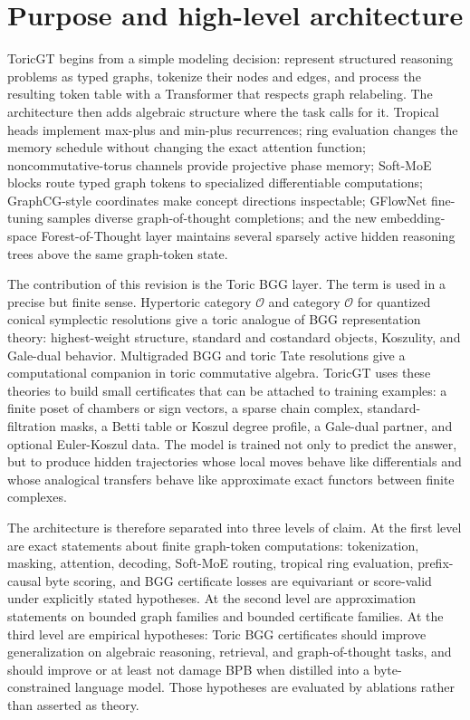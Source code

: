 \documentclass[11pt]{article}
\theoremstyle{definition}
\theoremstyle{plain}
\theoremstyle{remark}
\numberwithin{equation}{section}
\begin{document}
\tableofcontents
\newpage


\section{Purpose and high-level architecture}

ToricGT begins from a simple modeling decision: represent structured reasoning problems as typed graphs, tokenize their nodes and edges, and process the resulting token table with a Transformer that respects graph relabeling.  The architecture then adds algebraic structure where the task calls for it.  Tropical heads implement max-plus and min-plus recurrences; ring evaluation changes the memory schedule without changing the exact attention function; noncommutative-torus channels provide projective phase memory; Soft-MoE blocks route typed graph tokens to specialized differentiable computations; GraphCG-style coordinates make concept directions inspectable; GFlowNet fine-tuning samples diverse graph-of-thought completions; and the new embedding-space Forest-of-Thought layer maintains several sparsely active hidden reasoning trees above the same graph-token state.

The contribution of this revision is the Toric BGG layer.  The term is used in a precise but finite sense.  Hypertoric category $\mathcal O$ and category $\mathcal O$ for quantized conical symplectic resolutions give a toric analogue of BGG representation theory: highest-weight structure, standard and costandard objects, Koszulity, and Gale-dual behavior.  Multigraded BGG and toric Tate resolutions give a computational companion in toric commutative algebra.  ToricGT uses these theories to build small certificates that can be attached to training examples: a finite poset of chambers or sign vectors, a sparse chain complex, standard-filtration masks, a Betti table or Koszul degree profile, a Gale-dual partner, and optional Euler-Koszul data.  The model is trained not only to predict the answer, but to produce hidden trajectories whose local moves behave like differentials and whose analogical transfers behave like approximate exact functors between finite complexes.

The architecture is therefore separated into three levels of claim.  At the first level are exact statements about finite graph-token computations: tokenization, masking, attention, decoding, Soft-MoE routing, tropical ring evaluation, prefix-causal byte scoring, and BGG certificate losses are equivariant or score-valid under explicitly stated hypotheses.  At the second level are approximation statements on bounded graph families and bounded certificate families.  At the third level are empirical hypotheses: Toric BGG certificates should improve generalization on algebraic reasoning, retrieval, and graph-of-thought tasks, and should improve or at least not damage BPB when distilled into a byte-constrained language model.  Those hypotheses are evaluated by ablations rather than asserted as theory.
\end{document}
